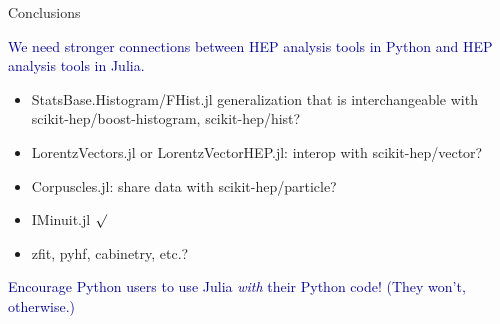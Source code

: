 \documentclass[aspectratio=169]{beamer}
\begin{document}
\begin{frame}{Conclusions}
\vspace{0.5 cm}
\LARGE
\begin{center}
\textcolor{darkblue}{We need stronger connections between HEP analysis tools in Python and HEP analysis tools in Julia.}
\end{center}

\large
\vspace{0.5 cm}
\begin{itemize}\setlength{\itemsep}{0.2 cm}
\item StatsBase.Histogram/FHist.jl generalization that is interchangeable with scikit-hep/boost-histogram, scikit-hep/hist?
\item LorentzVectors.jl or LorentzVectorHEP.jl: interop with scikit-hep/vector?
\item Corpuscles.jl: share data with scikit-hep/particle?
\item IMinuit.jl $\surd$
\item zfit, pyhf, cabinetry, etc.?
\end{itemize}

\normalsize
\vspace{0.5 cm}
\textcolor{darkblue}{Encourage Python users to use Julia {\it with} their Python code! (They won't, otherwise.)}
\end{frame}
\end{document}
